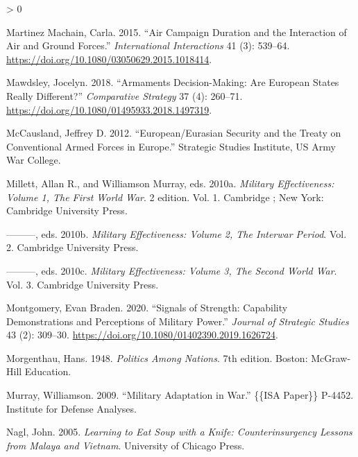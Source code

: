 \documentclass[
]{article}
\newlength{\cslhangindent}
\newenvironment{CSLReferences}[2] %
 {%
  \setlength{\parindent}{0pt}
  \ifodd #1 \everypar{\setlength{\hangindent}{\cslhangindent}}\ignorespaces\fi
  \ifnum #2 > 0
  \setlength{\parskip}{#2\baselineskip}
  \fi
 }%
 {}
\begin{document}
\begin{CSLReferences}{1}{0}
\leavevmode\hypertarget{ref-martinezmachain_aircampaignduration_2015}{}%
Martinez Machain, Carla. 2015. {``Air {Campaign Duration} and the {Interaction} of {Air} and {Ground Forces}.''} \emph{International Interactions} 41 (3): 539--64. \url{https://doi.org/10.1080/03050629.2015.1018414}.

\leavevmode\hypertarget{ref-mawdsley_armamentsdecisionmakingare_2018}{}%
Mawdsley, Jocelyn. 2018. {``Armaments Decision-Making: {Are European} States Really Different?''} \emph{Comparative Strategy} 37 (4): 260--71. \url{https://doi.org/10.1080/01495933.2018.1497319}.

\leavevmode\hypertarget{ref-mccausland_europeaneurasiansecurity_2012}{}%
McCausland, Jeffrey D. 2012. {``European/{Eurasian Security} and the {Treaty} on {Conventional Armed Forces} in {Europe}.''} {Strategic Studies Institute, US Army War College}.

\leavevmode\hypertarget{ref-millett_militaryeffectivenessvolume_2010}{}%
Millett, Allan R., and Williamson Murray, eds. 2010a. \emph{Military {Effectiveness}: {Volume} 1, {The First World War}}. 2 edition. Vol. 1. {Cambridge ; New York}: {Cambridge University Press}.

\leavevmode\hypertarget{ref-millett_militaryeffectivenessvolume_2010a}{}%
---------, eds. 2010b. \emph{Military {Effectiveness}: {Volume} 2, {The Interwar Period}}. Vol. 2. {Cambridge University Press}.

\leavevmode\hypertarget{ref-millett_militaryeffectivenessvolume_2010b}{}%
---------, eds. 2010c. \emph{Military {Effectiveness}: {Volume} 3, {The Second World War}}. Vol. 3. {Cambridge University Press}.

\leavevmode\hypertarget{ref-montgomery_signalsstrengthcapability_2020}{}%
Montgomery, Evan Braden. 2020. {``Signals of Strength: {Capability} Demonstrations and Perceptions of Military Power.''} \emph{Journal of Strategic Studies} 43 (2): 309--30. \url{https://doi.org/10.1080/01402390.2019.1626724}.

\leavevmode\hypertarget{ref-morgenthau_politicsnations_1948}{}%
Morgenthau, Hans. 1948. \emph{Politics {Among Nations}}. 7th edition. {Boston}: {McGraw-Hill Education}.

\leavevmode\hypertarget{ref-murray_militaryadaptationwar_2009}{}%
Murray, Williamson. 2009. {``Military {Adaptation} in {War}.''} \{\{ISA Paper\}\} P-4452. {Institute for Defense Analyses}.

\leavevmode\hypertarget{ref-nagl_learningeatsoup_2005}{}%
Nagl, John. 2005. \emph{Learning to {Eat Soup} with a {Knife}: {Counterinsurgency Lessons} from {Malaya} and {Vietnam}}. {University of Chicago Press}.


\end{CSLReferences}
\end{document}
